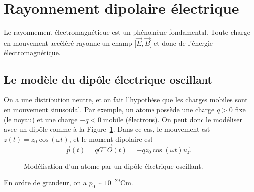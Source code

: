 \section{Rayonnement dipolaire électrique}

Le rayonnement électromagnétique est un phénomène fondamental. Toute charge en mouvement accéléré rayonne un champ [$\vec{E},\vec{B}$] et donc de l'énergie électromagnétique.

\subsection{Le modèle du dipôle électrique oscillant}

On a une distribution neutre, et on fait l'hypothèse que les charges mobiles sont en mouvement sinusoïdal. Par exemple, un atome possède une charge $q>0$ fixe (le noyau) et une charge $-q<0$ mobile (électrons). On peut donc le modéliser avec un dipôle comme à la Figure~\ref{fig:modelisation_atome_dipole_oscillant}. Dans ce cas, le mouvement est~$z(t)=z_{0}\cos(\omega t)$, et le moment dipolaire est
\begin{equation*}
    \boxed{
        \vec{p}(t)=q\vec{G^{-}O}(t)=-qz_{0}\cos(\omega t)\vec{u_{z}}.
    }
\end{equation*}

\begin{figure}
    \centering
    \caption{Modélisation d'un atome par un dipôle électrique oscillant.}    
    \label{fig:modelisation_atome_dipole_oscillant}
\end{figure}

En ordre de grandeur, on a $p_{0}\sim 10^{-29}\si{\coulomb\metre}$.